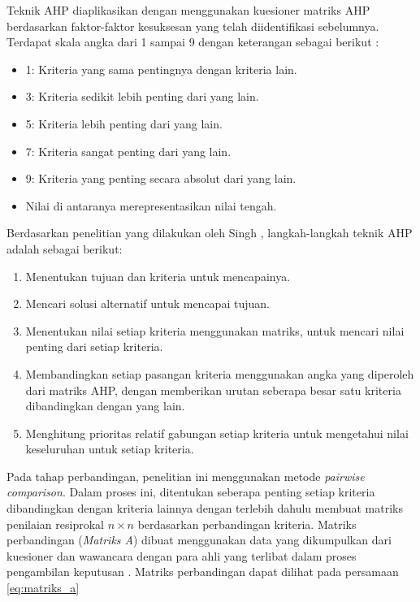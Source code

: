 \documentclass[journal,article,submit,pdftex,moreauthors]{Definitions/mdpi}
\begin{document}
Teknik AHP diaplikasikan dengan menggunakan kuesioner matriks AHP berdasarkan faktor-faktor kesuksesan yang telah diidentifikasi sebelumnya. Terdapat skala angka dari 1 sampai 9 dengan keterangan sebagai berikut \cite{Saaty1990}:
\begin{itemize}
    \item 1: Kriteria yang sama pentingnya dengan kriteria lain.
    \item 3: Kriteria sedikit lebih penting dari yang lain.
    \item 5: Kriteria lebih penting dari yang lain.
    \item 7: Kriteria sangat penting dari yang lain.
    \item 9: Kriteria yang penting secara absolut dari yang lain.
    \item Nilai di antaranya merepresentasikan nilai tengah.
\end{itemize}

Berdasarkan penelitian yang dilakukan oleh Singh \cite{Singh2019}, langkah-langkah teknik AHP adalah sebagai berikut:
\begin{enumerate}
    \item Menentukan tujuan dan kriteria untuk mencapainya.
    \item Mencari solusi alternatif untuk mencapai tujuan.
    \item Menentukan nilai setiap kriteria menggunakan matriks, untuk mencari nilai penting dari setiap kriteria.
    \item Membandingkan setiap pasangan kriteria menggunakan angka yang diperoleh dari matriks AHP, dengan memberikan urutan seberapa besar satu kriteria dibandingkan dengan yang lain.
    \item Menghitung prioritas relatif gabungan setiap kriteria untuk mengetahui nilai keseluruhan untuk setiap kriteria.
\end{enumerate}

Pada tahap perbandingan, penelitian ini menggunakan metode \textit{pairwise comparison}. Dalam proses ini, ditentukan seberapa penting setiap kriteria dibandingkan dengan kriteria lainnya dengan terlebih dahulu membuat matriks penilaian resiprokal $n \times n$ berdasarkan perbandingan kriteria. Matriks perbandingan (\textit{Matriks A}) dibuat menggunakan data yang dikumpulkan dari kuesioner dan wawancara dengan para ahli yang terlibat dalam proses pengambilan keputusan \cite{Singh2019}. Matriks perbandingan dapat dilihat pada persamaan \ref{eq:matriks_a}
\end{document}
